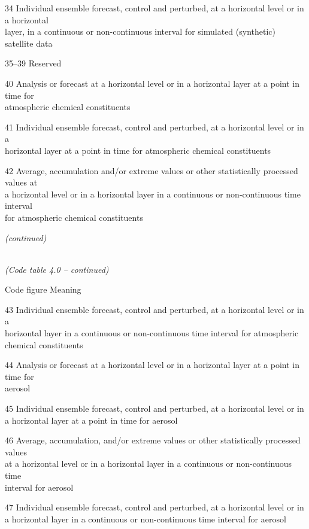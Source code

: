 34 Individual ensemble forecast, control and perturbed, at a horizontal level or in a horizontal\\
layer, in a continuous or non-continuous interval for simulated (synthetic) satellite data

35--39 Reserved

40 Analysis or forecast at a horizontal level or in a horizontal layer at a point in time for\\
atmospheric chemical constituents

41 Individual ensemble forecast, control and perturbed, at a horizontal level or in a\\
horizontal layer at a point in time for atmospheric chemical constituents

42 Average, accumulation and/or extreme values or other statistically processed values at\\
a horizontal level or in a horizontal layer in a continuous or non-continuous time interval\\
for atmospheric chemical constituents

\emph{(continued)}

\emph{\\
(Code table 4.0 -- continued)}

Code figure Meaning

43 Individual ensemble forecast, control and perturbed, at a horizontal level or in a\\
horizontal layer in a continuous or non-continuous time interval for atmospheric\\
chemical constituents

44 Analysis or forecast at a horizontal level or in a horizontal layer at a point in time for\\
aerosol

45 Individual ensemble forecast, control and perturbed, at a horizontal level or in\\
a horizontal layer at a point in time for aerosol

46 Average, accumulation, and/or extreme values or other statistically processed values\\
at a horizontal level or in a horizontal layer in a continuous or non-continuous time\\
interval for aerosol

47 Individual ensemble forecast, control and perturbed, at a horizontal level or in\\
a horizontal layer in a continuous or non-continuous time interval for aerosol

